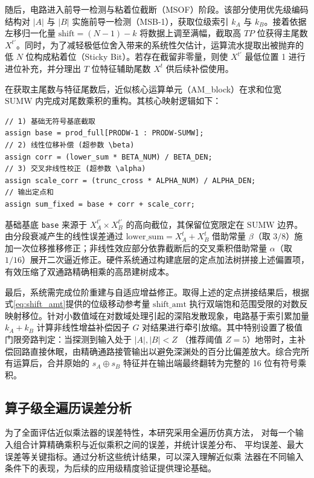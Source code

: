 \documentclass[12pt,a4paper,UTF8]{article}
\begin{document}
随后，电路进入前导一检测与粘着位截断（MSOF）阶段。该部分使用优先级编码结构对 $|A|$ 与 $|B|$ 实施前导一检测（MSB-1），获取位级索引 $k_A$ 与 $k_B$。接着依据左移归一化量 $\mathrm{shift} = (N-1) - k$ 将数据上调至满幅，截取高 $TP$ 位获得主尾数 $X^{t'}$。同时，为了减轻极低位舍入带来的系统性欠估计，运算流水提取出被抛弃的低 $N$ 位构成粘着位（Sticky Bit）。若存在截留非零量，则使 $X^{t'}$ 最低位置 1 进行进位补充，并分理出 $T$ 位特征辅助尾数 $X^t$ 供后续补偿使用。

在获取主尾数与特征尾数后，近似核心运算单元（AM\_block）在求和位宽 $\mathrm{SUMW}$ 内完成对尾数乘积的重构。其核心映射逻辑如下：

\begin{lstlisting}[caption={LETAM AM\_block 补偿校正的 Verilog 实现},label={lst:letam-am-block},basicstyle=\ttfamily\small,language={}]
// 1) 基础无符号基底截取
assign base = prod_full[PRODW-1 : PRODW-SUMW];
// 2) 线性位移补偿 (超参数 \beta)
assign corr = (lower_sum * BETA_NUM) / BETA_DEN;
// 3) 交叉非线性校正 (超参数 \alpha)
assign scale_corr = (trunc_cross * ALPHA_NUM) / ALPHA_DEN;
// 输出定点和
assign sum_fixed = base + corr + scale_corr;
\end{lstlisting}

基础基底 \texttt{base} 来源于 $X_A^{t'} \times X_B^{t'}$ 的高向截位，其保留位宽限定在 $\mathrm{SUMW}$ 边界。由分段衰减产生的线性误差通过 $\mathrm{lower\_sum} = X_A^t + X_B^t$ 借助常量 $\beta$（取 $3/8$）施加一次位移推移修正；非线性效应部分依靠截断后的交叉乘积借助常量 $\alpha$（取 $1/16$）展开二次逼近修正。硬件系统通过构建底层的定点加法树拼接上述偏置项，有效压缩了双通路精确相乘的高昂建树成本。

最后，系统需完成位阶重建与自适应增益修正。取得上述的定点拼接结果后，根据式\eqref{eq:shift_amt}提供的位级移动参考量 $\mathrm{shift\_amt}$ 执行双端饱和范围受限的对数反映射移位。针对小数值域在对数域处理引起的深陷发散现象，电路基于索引累加量 $k_A+k_B$ 计算非线性增益补偿因子 $G$ 对结果进行牵引放缩。其中特别设置了极值门限旁路判定：当探测到输入处于 $|A|,|B| < Z$ （推荐阈值 $Z=5$）地带时，主补偿回路直接休眠，由精确通路接管输出以避免深渊处的百分比偏差放大。综合完所有运算后，合并原始的 $s_A \oplus s_B$ 特征并在输出端最终翻转为完整的 16 位有符号乘积。

\subsection{算子级全遍历误差分析}
为了全面评估近似乘法器的误差特性，本研究采用全遍历仿真方法，
对每一个输入组合计算精确乘积与近似乘积之间的误差，并统计误差分布、
平均误差、最大误差等关键指标。通过分析这些统计结果，可以深入理解近似乘
法器在不同输入条件下的表现，为后续的应用级精度验证提供理论基础。
\end{document}
